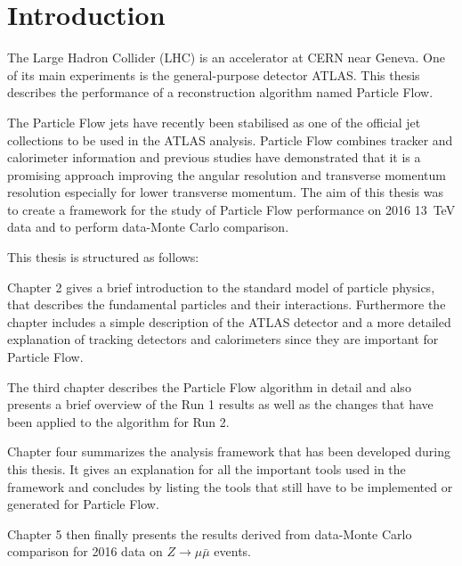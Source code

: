 \chapter{Introduction}
\label{sec:intro}

The Large Hadron Collider (LHC) is an accelerator at CERN near Geneva. One of its main experiments is the general-purpose detector ATLAS. This thesis describes the performance of a reconstruction algorithm named Particle Flow.


The Particle Flow jets have recently been stabilised as one of the official jet collections to be used in the ATLAS analysis. Particle Flow combines tracker and calorimeter information and previous studies\cite{pflow16} have demonstrated that it is a promising approach improving the angular resolution and transverse momentum resolution especially for lower transverse momentum. The aim of this thesis was to create a framework for the study of Particle Flow performance on 2016 \SI{13}{\TeV} data and to perform data-Monte Carlo comparison.

This thesis is structured as follows:

Chapter 2 gives a brief introduction to the standard model of particle physics, that describes the fundamental particles and their interactions. Furthermore the chapter includes a simple description of the ATLAS detector and a more detailed explanation of tracking detectors and calorimeters since they are important for Particle Flow.

The third chapter describes the Particle Flow algorithm in detail and also presents a brief overview of the Run 1 results as well as the changes that have been applied to the algorithm for Run 2.

Chapter four summarizes the analysis framework that has been developed during this thesis. It gives an explanation for all the important tools used in the framework and concludes by listing the tools that still have to be implemented or generated for Particle Flow.

Chapter 5 then finally presents the results derived from data-Monte Carlo comparison for 2016 data on $Z\rightarrow \mu \bar{\mu}$ events.




